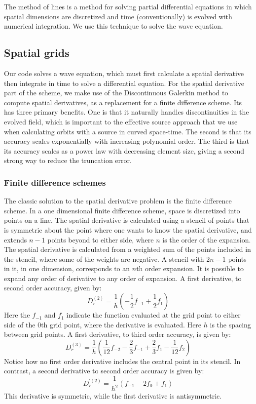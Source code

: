 The method of lines is a method for solving partial differential equations in which spatial dimensions are discretized and time (conventionally) is evolved with numerical integration. We use this technique to solve the wave equation. 

\subsection{Spatial grids}
Our code solves a wave equation, which must first calculate a spatial derivative then integrate in time to solve a differential equation. For the spatial derivative part of the scheme, we make use of the Discontinuous Galerkin method to compute spatial derivatives, as a replacement for a finite difference scheme. Its has three primary benefits. One is that it naturally handles discontinuities in the evolved field, which is important to the effective source approach that we use when calculating orbits with a source in curved space-time. The second is that its accuracy scales exponentially with increasing polynomial order. The third is that its accuracy scales as a power law with decreasing element size, giving a second strong way to reduce the truncation error.


\subsubsection{Finite difference schemes}
The classic solution to the spatial derivative problem is the finite difference scheme. In a one dimensional finite difference scheme, space is discretized into points on a line. The spatial derivative is calculated using a stencil of points that is symmetric about the point where one wants to know the spatial derivative, and extends $n-1$ points beyond to either side, where $n$ is the order of the expansion. The spatial derivative is calculated from a weighted sum of the points included in the stencil, where some of the weights are negative. A stencil with $2n-1$ points in it, in one dimension, corresponds to an $n$th order expansion. It is possible to expand any order of derivative to any order of expansion. A first derivative, to second order accuracy, given by:
\begin{equation}
  D_r^{(2)}=\frac{1}{h}(-\frac{1}{2}f_{-1}+\frac{1}{2}f_1)
\end{equation}
Here the $f_{-1}$ and $f_1$ indicate the function evaluated at the grid point to either side of the $0$th grid point, where the derivative is evaluated. Here $h$ is the spacing between grid points. A first derivative, to third order accuracy, is given by:
\begin{equation}
  D_r^{(3)}=\frac{1}{h}(\frac{1}{12}f_{-2}-\frac{2}{3}f_{-1}+\frac{2}{3}f_1-\frac{1}{12}f_2)
\end{equation}
Notice how no first order derivative includes the central point in its stencil. In contrast, a second derivative to second order accuracy is given by:
\begin{equation}
  D_r^{\prime (2)}=\frac{1}{h^2}(f_{-1}-2f_0+f_1)
\end{equation}
This derivative is symmetric, while the first derivative is antisymmetric.


